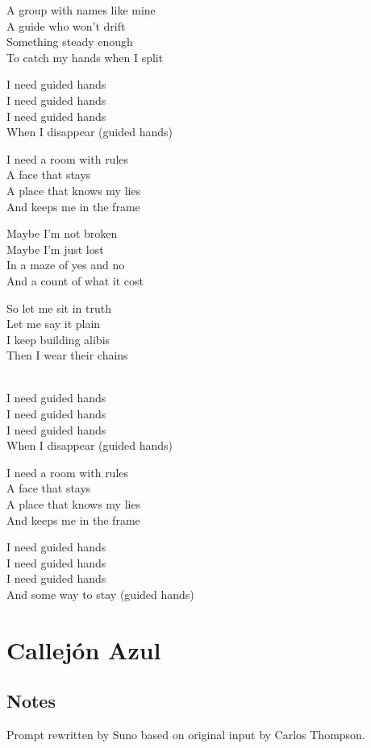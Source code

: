 \begin{lyrics}
A group with names like mine\\
A guide who won't drift\\
Something steady enough\\
To catch my hands when I split

I need guided hands\\
I need guided hands\\
I need guided hands\\
When I disappear (guided hands)

I need a room with rules\\
A face that stays\\
A place that knows my lies\\
And keeps me in the frame

Maybe I'm not broken\\
Maybe I'm just lost\\
In a maze of yes and no\\
And a count of what it cost

So let me sit in truth\\
Let me say it plain\\
I keep building alibis\\
Then I wear their chains

\\
I need guided hands\\
I need guided hands\\
I need guided hands\\
When I disappear (guided hands)

I need a room with rules\\
A face that stays\\
A place that knows my lies\\
And keeps me in the frame

I need guided hands\\
I need guided hands\\
I need guided hands\\
And some way to stay (guided hands)

\end{lyrics}

\section{Callejón Azul}

\subsection{Notes}
Prompt rewritten by Suno based on original input by Carlos Thompson.


